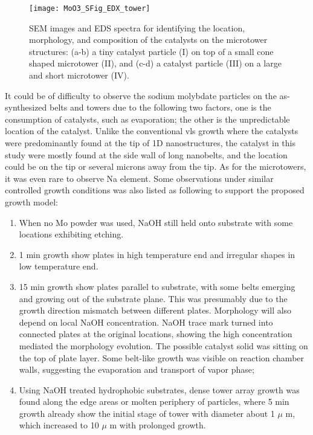 \begin{figure}[htb]
\centering
\texttt{[image: MoO3\_SFig\_EDX\_tower]}
\caption[Identifying the catalysts on the microtower structures]{SEM images and EDS spectra for identifying the location, morphology, and composition of the catalysts on the microtower structures: (a-b) a tiny catalyst particle (I) on top of a small cone shaped microtower (II), and (c-d) a catalyst particle (III) on a large and short microtower (IV).}
\label{fig:ch4edx2}
\end{figure}
It could be of difficulty to observe the sodium molybdate particles on the as-synthesized belts and towers due to the following two factors, one is the consumption of catalysts, such as evaporation; the other is the unpredictable location of the catalyst. Unlike the conventional \gls{vls} growth where the catalysts were predominantly found at the tip of 1D nanostructures, the catalyst in this study were mostly found at the side wall of long nanobelts, and the location could be on the tip or several microns away from the tip. As for the microtowers, it was even rare to observe Na element. Some observations under similar controlled growth conditions was also listed as following to support the proposed growth model: 
\begin{enumerate}
\item When no Mo powder was used, NaOH still held onto substrate with some locations exhibiting etching.
\item 1 min growth show plates in high temperature end and irregular shapes in low temperature end.
\item 15 min growth show  plates parallel to substrate, with some belts emerging and growing out of the substrate plane. This was presumably due to the growth direction mismatch between different plates. Morphology will also depend on local NaOH concentration. NaOH trace mark turned into connected plates at the original locations, showing the high concentration mediated the morphology evolution. The possible catalyst solid was sitting on the top of plate layer. Some belt-like growth was visible on reaction chamber walls, suggesting the evaporation and transport of  vapor phase;
\item Using NaOH treated hydrophobic substrates, dense tower array growth was found along the edge areas or molten periphery of particles, where 5 min growth already show the initial stage of tower with diameter about 1 $\mu$ m, which increased to 10 $\mu$ m with prolonged growth.
\end{enumerate}

